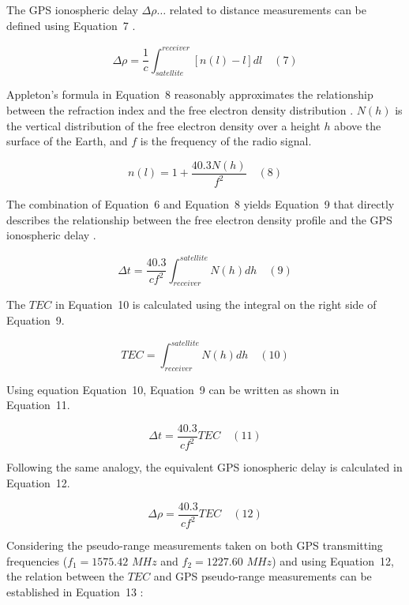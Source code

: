 \documentclass[sn-mathphys-num]{sn-jnl}%
\begin{document}
The GPS ionospheric delay $\Delta \rho \dots$ related to distance measurements can be defined using Equation~7 \cite{spilker1996global}.

\begin{equation}
	\Delta \rho = \frac{1}{c} \int_{satellite}^{receiver} \left[ n(l) - l \right]dl
	\quad\left(7\right)
\end{equation}

Appleton’s formula in Equation~8 reasonably approximates the relationship between the refraction index and the free electron density distribution \cite{davies1990ionospheric, spilker1996global}. $N(h)$ is the vertical distribution of the free electron density over a height $h$ above the surface of the Earth, and $f$ is the frequency of the radio signal.

\begin{equation}
	n(l) = 1 + \frac{40.3 N(h)}{f^{2}}
	\quad\left(8\right)
\end{equation}

The combination of Equation~6 and Equation~8 yields Equation~9 that directly describes the relationship between the free electron density profile and the GPS ionospheric delay \cite{spilker1996global}.

\begin{equation}
	\Delta t = \frac{40.3}{c f^{2}} \int_{receiver}^{satellite} N(h)dh
	\quad\left(9\right)
\end{equation}

The $TEC$ \cite{spilker1996global} in Equation~10 is calculated using the integral on the right side of Equation~9.

\begin{equation}
	TEC = \int_{receiver}^{satellite} N(h)dh
	\quad\left(10\right)
\end{equation}

Using equation Equation~10, Equation~9 can be written as shown in Equation~11.

\begin{equation}
	\Delta t = \frac{40.3}{c f^{2}} TEC
	\quad\left(11\right)
\end{equation}

Following the same analogy, the equivalent GPS ionospheric delay is calculated in Equation~12.

\begin{equation}
	\Delta \rho = \frac{40.3}{c f^{2}} TEC
	\quad\left(12\right)
\end{equation}

Considering the pseudo-range measurements taken on both GPS transmitting frequencies ($f_{1}=1575.42$ $MHz$ and $f_{2}=1227.60$ $MHz$) and using Equation~12, the relation between the $TEC$ and GPS pseudo-range measurements can be established in Equation~13 \cite{spilker1996global}:
 
\end{document}
